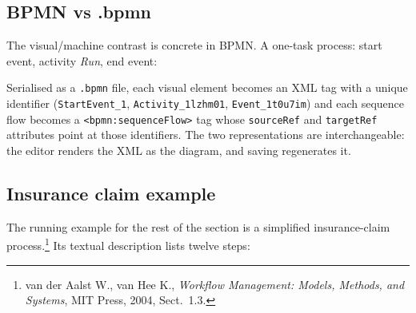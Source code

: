 \subsection{BPMN vs .bpmn}

The visual/machine contrast is concrete in BPMN. A one-task process: start event, activity \emph{Run}, end event:

\begin{center}
\end{center}

Serialised as a \texttt{.bpmn} file, each visual element becomes an XML tag with a unique identifier (\verb|StartEvent_1|, \verb|Activity_1lzhm01|, \verb|Event_1t0u7im|) and each sequence flow becomes a \verb|<bpmn:sequenceFlow>| tag whose \verb|sourceRef| and \verb|targetRef| attributes point at those identifiers. The two representations are interchangeable: the editor renders the XML as the diagram, and saving regenerates it.

\subsection{Insurance claim example}

The running example for the rest of the section is a simplified insurance-claim process.\footnote{van der Aalst W., van Hee K., \emph{Workflow Management: Models, Methods, and Systems}, MIT Press, 2004, Sect.~1.3.} Its textual description lists twelve steps:


